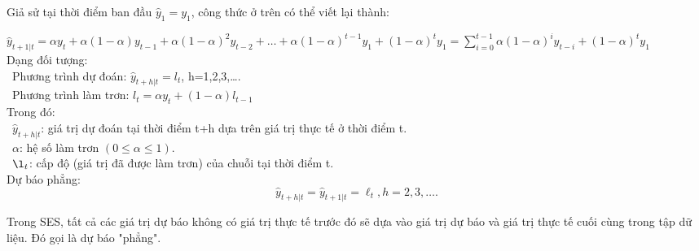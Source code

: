\documentclass[conference]{IEEEtran}
\begin{document}
Giả sử tại thời điểm ban đầu \(\hat{y}_1=y_1\), công thức ở trên có thể viết lại thành:

\({\hat{y}}_{t+1|t}=\alpha y_t+\alpha\left(1-\alpha\right)y_{t-1}+\alpha\left(1-\alpha\right)^2y_{t-2}+\ldots+\alpha\left(1-\alpha\right)^{t-1}y_1+{(1-\alpha)}^ty_1=\sum_{i=0}^{t-1}\alpha{(1-\alpha)}^iy_{t-i}+{(1-\alpha)}^ty_1\)\\

Dạng đối tượng:\\
\indent\textbullet\ Phương trình dự đoán: \(\hat{y}_{t+h|t}=l_t\), h=1,2,3,\dots.\\
\indent\textbullet\ Phương trình làm trơn: \(l_t=\alpha y_t+(1-\alpha)l_{t-1}\)\\

Trong đó:\\
\indent\textbullet\ \(\hat{y}_{t+h|t} \): giá trị dự đoán tại thời điểm t+h dựa trên giá trị thực tế ở thời điểm t.\\
\indent\textbullet\ \(\alpha\): hệ số làm trơn \((0\le\alpha\le1)\).\\
\indent\textbullet\ \(\l_t \): cấp độ (giá trị đã được làm trơn) của chuỗi tại thời điểm t.\\

Dự báo phẳng:
\[\hat{y}_{t+h|t} = \hat{y}_{t+1|t}=\ell_t, h=2,3,\dots.\]

Trong SES, tất cả các giá trị dự báo không có giá trị thực tế trước đó sẽ dựa vào giá trị dự báo và giá trị thực tế cuối cùng trong tập dữ liệu. Đó gọi là dự báo "phẳng".
\end{document}
